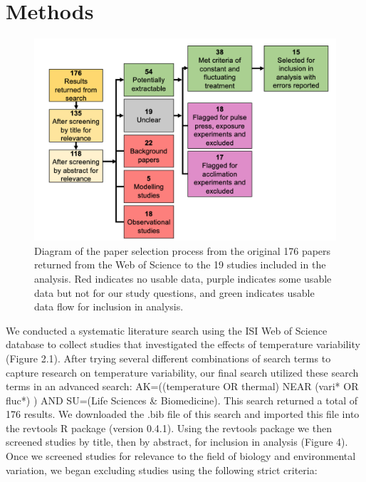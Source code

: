 \documentclass[12pt,twoside]{reedthesis}
\begin{document}
\hypertarget{methods}{%
\chapter{Methods}\label{methods}}
\begin{figure}

{\centering \includegraphics[width=0.9\linewidth]{figures/figure5} 

}

\caption[Meta-analysis paper selection process]{Diagram of the paper selection process from the original 176 papers returned from the Web of Science to the 19 studies included in the analysis. Red indicates no usable data, purple indicates some usable data but not for our study questions, and green indicates usable data flow for inclusion in analysis.}\label{fig:unnamed-chunk-7}
\end{figure}
We conducted a systematic literature search using the ISI Web of Science database to collect studies that investigated the effects of temperature variability (Figure 2.1). After trying several different combinations of search terms to capture research on temperature variability, our final search utilized these search terms in an advanced search: AK=((temperature OR thermal) NEAR (vari* OR fluc*) ) AND SU=(Life Sciences \& Biomedicine). This search returned a total of 176 results. We downloaded the .bib file of this search and imported this file into the revtools R package (version 0.4.1). Using the revtools package we then screened studies by title, then by abstract, for inclusion in analysis (Figure 4). Once we screened studies for relevance to the field of biology and environmental variation, we began excluding studies using the following strict criteria:
\end{document}
